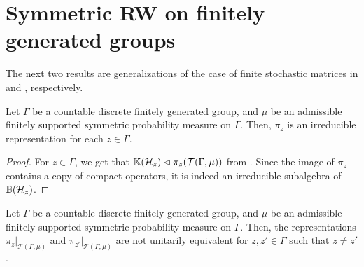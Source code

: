 \documentclass[12pt, class = article, crop = false, a4paper, twoside]{standalone}
\begin{document}
\section{Symmetric RW on finitely generated groups}
\label{sec:amenable}

The next two results are generalizations of the case of finite stochastic matrices in \cite[Proposition 3.3]{DOMA17} and \cite[Proposition 3.4]{DOMA17}, respectively. 
\begin{proposition}

    Let $\Gamma$ be a countable discrete finitely generated group, and $\mu$ be an admissible finitely supported symmetric probability measure on $\Gamma$. Then, $\pi_{z}$ is an irreducible representation for each $z\in\Gamma$.
\end{proposition}

\begin{proof}

    For $z\in\Gamma$, we get that $\mathbb{K}(\mathcal{H}_{z})\lhd\pi_{z}(\mathcal{T}(\Gamma, \mu))$ from \cite[Proposition 4.4]{DOAD21}. Since the image of $\pi_{z}$ contains a copy of compact operators, it is indeed an irreducible subalgebra of $\mathbb{B}(\mathcal{H}_{z})$.
\end{proof}

\begin{proposition}

    Let $\Gamma$ be a countable discrete finitely generated group, and $\mu$ be an admissible finitely supported symmetric probability measure on $\Gamma$. Then, the representations $\pi_{z}|_{\mathcal{T}(\Gamma, \mu)}$ and $\pi_{z'}|_{\mathcal{T}(\Gamma, \mu)}$ are not unitarily equivalent for $z, z'\in\Gamma$ such that $z\neq z'$.
\end{proposition}
\end{document}
